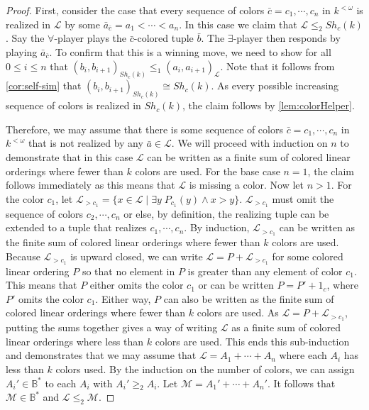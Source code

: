 \documentclass[11pt]{amsart}
\newcommand{\mc}[1]{\mathcal{#1}}
\theoremstyle{remark}
\begin{document}
\begin{proof}
    First, consider the case that every sequence of colors $\bar{c}=c_1,\cdots,c_n$ in $k^{<\omega}$ is realized in $\mc{L}$ by some $\bar{a}_{\bar{c}}=a_1<\cdots<a_n$.
    In this case we claim that $\mc{L}\leq_2 Sh_c(k)$.
		Say the $\forall$-player plays the $\bar{c}$-colored tuple $\bar{b}$.
    The $\exists$-player then responds by playing $\bar{a}_{\bar{c}}$.
    To confirm that this is a winning move, we need to show for all $0\leq i\leq n$ that $(b_i,b_{i+1})_{Sh_c(k)}\leq_1(a_i,a_{i+1})_{\mc{L}}$.
    Note that it follows from \cref{cor:self-sim} that $(b_i,b_{i+1})_{Sh_c(k)}\cong Sh_c(k)$.
    As every possible increasing sequence of colors is realized in $Sh_c(k)$, the claim follows by \cref{lem:colorHelper}.
    
    Therefore, we may assume that there is some sequence of colors $\bar{c}=c_1,\cdots,c_n$ in $k^{<\omega}$ that is not realized by any $\bar{a}\in\mc{L}$.
    We will proceed with induction on $n$ to demonstrate that in this case $\mc{L}$ can be written as a finite sum of colored linear orderings where fewer than $k$ colors are used.
    For the base case $n=1$, the claim follows immediately as this means that $\mc{L}$ is missing a color.
    Now let $n>1$.
    For the color $c_1$, let $\mc{L}_{>c_1}=\{x\in\mc{L}\mid \exists y \; P_{c_1}(y) \land x>y\}.$
    $\mc{L}_{>c_1}$ must omit the sequence of colors $c_2,\cdots,c_{n}$ or else, by definition, the realizing tuple can be extended to a tuple that realizes $c_1,\cdots,c_n$.
    By induction, $\mc{L}_{>c_1}$ can be written as the finite sum of colored linear orderings where fewer than $k$ colors are used.
    Because $\mc{L}_{>c_1}$ is upward closed, we can write $\mc{L}=P+\mc{L}_{>c_1}$ for some colored linear ordering $P$ so that no element in $P$ is greater than any element of color $c_1$.
    This means that $P$ either omits the color $c_1$ or can be written $P=P'+1_c$, where $P'$ omits the color $c_1$.
    Either way, $P$ can also be written as the finite sum of colored linear orderings where fewer than $k$ colors are used.
    As $\mc{L}=P+\mc{L}_{>c_1}$, putting the sums together gives a way of writing $\mc{L}$ as a finite sum of colored linear orderings where less than $k$ colors are used.
    This ends this sub-induction and demonstrates that we may assume that $\mc{L}=A_1+\cdots+A_n$ where each $A_i$ has less than $k$ colors used.
    By the induction on the number of colors, we can assign $A_i'\in \mathbb{B}^*$ to each $A_i$ with $A_i'\geq_2 A_i$.
    Let $\mc{M}=A_1'+\cdots+A_n'$.
    It follows that $\mc{M}\in \mathbb{B}^*$ and $\mc{L}\leq_2 \mc{M}$.


\end{proof}
\end{document}

